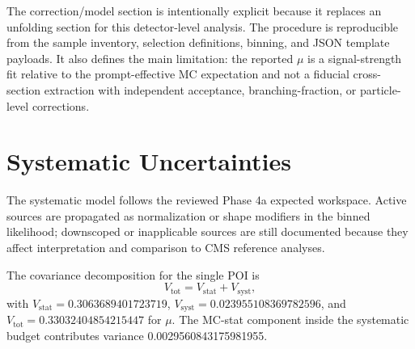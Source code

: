 \documentclass[11pt]{article}
\begin{document}
The correction/model section is intentionally explicit because it replaces an unfolding section for this detector-level analysis. The procedure is reproducible from the sample inventory, selection definitions, binning, and JSON template payloads. It also defines the main limitation: the reported $\mu$ is a signal-strength fit relative to the prompt-effective MC expectation and not a fiducial cross-section extraction with independent acceptance, branching-fraction, or particle-level corrections.
\section{Systematic Uncertainties}
The systematic model follows the reviewed Phase 4a expected workspace. Active sources are propagated as normalization or shape modifiers in the binned likelihood; downscoped or inapplicable sources are still documented because they affect interpretation and comparison to CMS reference analyses.

The covariance decomposition for the single POI is
\begin{equation}
 V_{\mathrm{tot}} = V_{\mathrm{stat}} + V_{\mathrm{syst}},
 \label{eq:cov-sum}
\end{equation}
with $V_{\mathrm{stat}}=0.3063689401723719$, $V_{\mathrm{syst}}=0.023955108369782596$, and $V_{\mathrm{tot}}=0.33032404854215447$ for $\mu$. The MC-stat component inside the systematic budget contributes variance 0.0029560843175981955.
\end{document}
